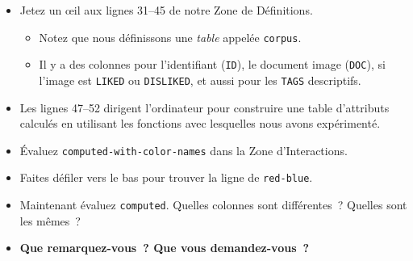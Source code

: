 \documentclass[12pt,a4paper]{article}
\begin{document}
\begin{activitybox}
  \begin{itemize}
    \item Jetez un œil aux lignes 31--45 de notre Zone de Définitions.
    \begin{itemize}
      \item Notez que nous définissons une \emph{table} appelée \texttt{corpus}.
      \item Il y a des colonnes pour l'identifiant (\texttt{ID}), le document image (\texttt{DOC}), si l'image est \texttt{LIKED} ou \texttt{DISLIKED}, et aussi pour les \texttt{TAGS} descriptifs.
    \end{itemize}
    \item Les lignes 47--52 dirigent l'ordinateur pour construire une table d'attributs calculés en utilisant les fonctions avec lesquelles nous avons expérimenté.
  \end{itemize}
\end{activitybox}

\begin{activitybox}
  \begin{itemize}
    \item Évaluez \texttt{computed-with-color-names} dans la Zone d'Interactions.
    \item Faites défiler vers le bas pour trouver la ligne de \texttt{red-blue}.
    \item Maintenant évaluez \texttt{computed}. Quelles colonnes sont différentes~? Quelles sont les mêmes~?
    \item \textbf{Que remarquez-vous~? Que vous demandez-vous~?}
  \end{itemize}
\end{activitybox}
\end{document}
